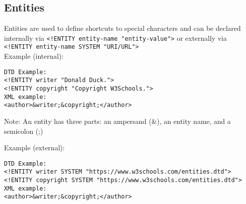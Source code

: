 \documentclass[11pt]{article}
\begin{document}
\subsection{Entities}
\label{sec:org96b2824}
Entities are used to define shortcuts to special characters and can be declared internally via \texttt{<!ENTITY entity-name "entity-value">} or externally via \texttt{<!ENTITY entity-name SYSTEM "URI/URL">}\\
Example (internal):
\lstset{breaklines=true,language=XML,label= ,caption= ,captionpos=b,numbers=none}
\begin{lstlisting}
DTD Example:
<!ENTITY writer "Donald Duck.">
<!ENTITY copyright "Copyright W3Schools.">
XML example:
<author>&writer;&copyright;</author>
\end{lstlisting}
Note: An entity has three parts: an ampersand (\&), an entity name, and a semicolon (;)

Example (external):
\lstset{breaklines=true,language=XML,label= ,caption= ,captionpos=b,numbers=none}
\begin{lstlisting}
DTD Example:
<!ENTITY writer SYSTEM "https://www.w3schools.com/entities.dtd">
<!ENTITY copyright SYSTEM "https://www.w3schools.com/entities.dtd">
XML example:
<author>&writer;&copyright;</author>
\end{lstlisting}
\end{document}
